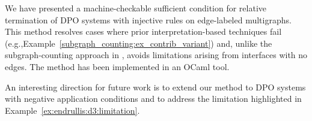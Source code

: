 We have presented a machine-checkable sufficient condition for relative termination of DPO systems with injective rules on edge-labeled multigraphs.  
This method resolves cases where prior interpretation-based techniques \cite{zantema2014termination,bruggink2014termination,bruggink2015proving,endrullis2024generalized_arxiv_v2,
overbeek2024termination_lmcs} fail (e.g.,Example~\ref{subgraph_counting:ex_contrib_variant}) and, unlike the subgraph-counting approach in \cite{overbeek2024termination_lmcs}, avoids limitations arising from interfaces with no edges.
The method has been implemented in an OCaml tool. 

An interesting direction for future work is to extend our method to DPO systems with negative application conditions and to address the limitation highlighted in Example~\ref{ex:endrullis:d3:limitation}.